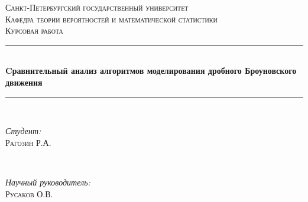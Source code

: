 \documentclass[a4paper,12pt]{article}
\numberwithin{equation}{section}
\begin{document}
	
	\begin{titlepage}
		
		\newcommand{\HRule}{\rule{\linewidth}{0.5mm}} %
		
		\center %
		
		
		\textsc{\LARGE Санкт-Петербургский государственный университет}\\[1.5cm] %
		\textsc{\Large Кафедра теории вероятностей и математической статистики}\\[0.5cm] %
		\textsc{\large Курсовая работа}\\[0.5cm]
		\HRule \\[0.6cm]
		{ \Large \bfseries Cравнительный анализ алгоритмов моделирования дробного Броуновского движения}\\[0.4cm] %
		\HRule \\[1.0cm]
		
		
		\begin{minipage}{0.4\textwidth}
			\begin{flushleft} \large
				\emph{Студент:}\\
				\textsc{Рагозин} Р.А. %
			\end{flushleft}
		\end{minipage}
		~
		\begin{minipage}{0.4\textwidth}
			\begin{flushright} \large
				\emph{Научный руководитель:} \\
				\textsc{Русаков} О.В. %
			\end{flushright}
		\end{minipage}\\[2cm]
		

\end{titlepage}
\end{document}
